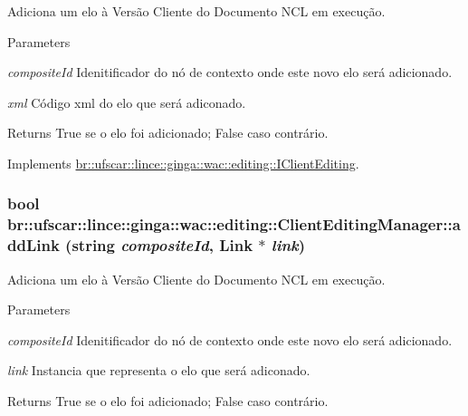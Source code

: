 Adiciona um elo à Versão Cliente do Documento NCL em execução. 


\begin{DoxyParams}{Parameters}
\item[{\em compositeId}]Idenitificador do nó de contexto onde este novo elo será adicionado. \item[{\em xml}]Código xml do elo que será adiconado. \end{DoxyParams}
\begin{DoxyReturn}{Returns}
True se o elo foi adicionado; False caso contrário. 
\end{DoxyReturn}


Implements \hyperlink{classbr_1_1ufscar_1_1lince_1_1ginga_1_1wac_1_1editing_1_1IClientEditing_aa9d2c5d6522cc5428abc2a3231299b74}{br::ufscar::lince::ginga::wac::editing::IClientEditing}.

\hypertarget{classbr_1_1ufscar_1_1lince_1_1ginga_1_1wac_1_1editing_1_1ClientEditingManager_a53cb5ddc1e425c7f03c7aacff140223c}{
\subsubsection[{addLink}]{\setlength{\rightskip}{0pt plus 5cm}bool br::ufscar::lince::ginga::wac::editing::ClientEditingManager::addLink (string {\em compositeId}, \/  Link $\ast$ {\em link})}}
\label{classbr_1_1ufscar_1_1lince_1_1ginga_1_1wac_1_1editing_1_1ClientEditingManager_a53cb5ddc1e425c7f03c7aacff140223c}


Adiciona um elo à Versão Cliente do Documento NCL em execução. 


\begin{DoxyParams}{Parameters}
\item[{\em compositeId}]Idenitificador do nó de contexto onde este novo elo será adicionado. \item[{\em link}]Instancia que representa o elo que será adiconado. \end{DoxyParams}
\begin{DoxyReturn}{Returns}
True se o elo foi adicionado; False caso contrário. 
\end{DoxyReturn}


